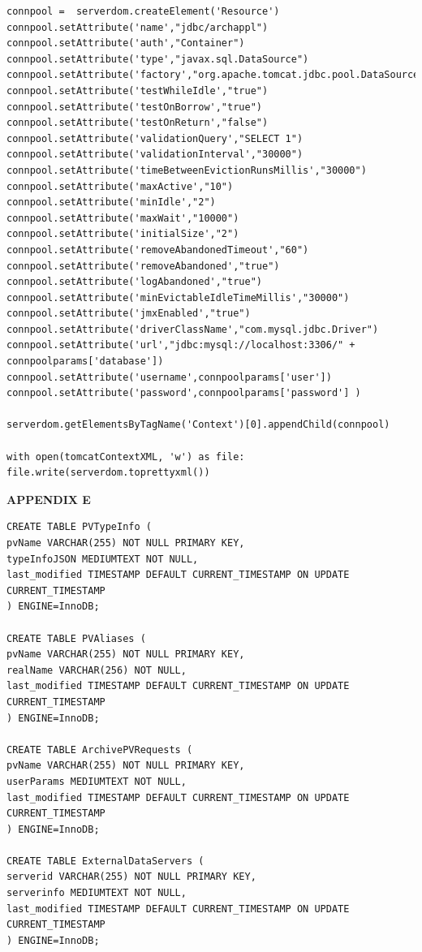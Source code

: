 \documentclass[11pt
  , a4paper
  , article
  , oneside
]{memoir}
\begin{document}
\begin{lstlisting}[style=termstyle]
connpool =  serverdom.createElement('Resource')
connpool.setAttribute('name',"jdbc/archappl")
connpool.setAttribute('auth',"Container")
connpool.setAttribute('type',"javax.sql.DataSource")
connpool.setAttribute('factory',"org.apache.tomcat.jdbc.pool.DataSourceFactory")
connpool.setAttribute('testWhileIdle',"true")
connpool.setAttribute('testOnBorrow',"true")
connpool.setAttribute('testOnReturn',"false")
connpool.setAttribute('validationQuery',"SELECT 1")
connpool.setAttribute('validationInterval',"30000")
connpool.setAttribute('timeBetweenEvictionRunsMillis',"30000")
connpool.setAttribute('maxActive',"10")
connpool.setAttribute('minIdle',"2")
connpool.setAttribute('maxWait',"10000")
connpool.setAttribute('initialSize',"2")
connpool.setAttribute('removeAbandonedTimeout',"60")
connpool.setAttribute('removeAbandoned',"true")
connpool.setAttribute('logAbandoned',"true")
connpool.setAttribute('minEvictableIdleTimeMillis',"30000")
connpool.setAttribute('jmxEnabled',"true")
connpool.setAttribute('driverClassName',"com.mysql.jdbc.Driver")
connpool.setAttribute('url',"jdbc:mysql://localhost:3306/" + connpoolparams['database'])
connpool.setAttribute('username',connpoolparams['user'])
connpool.setAttribute('password',connpoolparams['password'] )

serverdom.getElementsByTagName('Context')[0].appendChild(connpool)

with open(tomcatContextXML, 'w') as file: 
file.write(serverdom.toprettyxml())
\end{lstlisting}
\begin{center}
	\label{appx:e}\LARGE\textbf{APPENDIX E}
\end{center}
\begin{lstlisting}[style=termstyle]
CREATE TABLE PVTypeInfo ( 
pvName VARCHAR(255) NOT NULL PRIMARY KEY,
typeInfoJSON MEDIUMTEXT NOT NULL,
last_modified TIMESTAMP DEFAULT CURRENT_TIMESTAMP ON UPDATE CURRENT_TIMESTAMP
) ENGINE=InnoDB;

CREATE TABLE PVAliases (
pvName VARCHAR(255) NOT NULL PRIMARY KEY,
realName VARCHAR(256) NOT NULL,
last_modified TIMESTAMP DEFAULT CURRENT_TIMESTAMP ON UPDATE CURRENT_TIMESTAMP
) ENGINE=InnoDB;

CREATE TABLE ArchivePVRequests ( 
pvName VARCHAR(255) NOT NULL PRIMARY KEY,
userParams MEDIUMTEXT NOT NULL,
last_modified TIMESTAMP DEFAULT CURRENT_TIMESTAMP ON UPDATE CURRENT_TIMESTAMP
) ENGINE=InnoDB;

CREATE TABLE ExternalDataServers ( 
serverid VARCHAR(255) NOT NULL PRIMARY KEY,
serverinfo MEDIUMTEXT NOT NULL,
last_modified TIMESTAMP DEFAULT CURRENT_TIMESTAMP ON UPDATE CURRENT_TIMESTAMP
) ENGINE=InnoDB;

\end{lstlisting}
\end{document}
